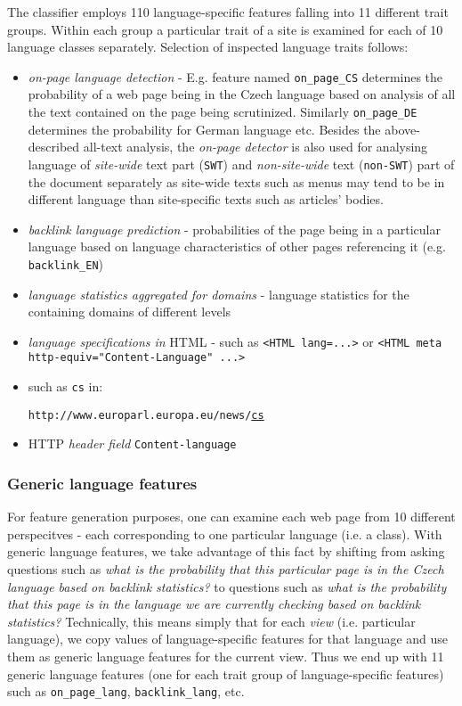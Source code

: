 \documentclass{acm_proc_article-sp}
\begin{document}
{  The classifier employs 110 language-specific features falling into 11 different trait groups. Within each group a
  particular trait of a site is examined for each of 10 language classes separately. Selection of
  inspected language traits follows: 
  \begin{itemize}
    \item \textit{on-page language detection} - E.g. feature named \texttt{on\_page\_CS} determines the
      probability of a web page being in the Czech language based on analysis of all the text
      contained on the page being scrutinized. Similarly \texttt{on\_page\_DE} determines the
      probability for German language etc. Besides the above-described all-text analysis, the \textit{on-page 
      detector} is also used for analysing language of \textit{site-wide} text part (\texttt{SWT}) and
    \textit{non-site-wide} text (\texttt{non-SWT}) part of the document separately as site-wide texts 
      such as menus may tend to be in different language than site-specific texts such as articles' bodies.
    \item \textit{backlink language prediction} - probabilities of the page being in a particular
      language based on language characteristics of other pages referencing it (e.g.
      \texttt{backlink\_EN})
    \item \textit{language statistics aggregated for domains} - language statistics for the
      containing domains of different levels
    \item \textit{language specifications in} HTML - such as \texttt{<HTML lang=...>} or \texttt{<HTML
      meta http-equiv="Content-Language"  ...>}
    \item {} such as \texttt{cs} in:

    \texttt{http://www.europarl.europa.eu/news/}\underline{\texttt{cs}} 
    \item HTTP \textit{header field} \texttt{Content-language}
  \end{itemize}


 \subsubsection{Generic language features}
    For feature generation purposes, one can examine each web page from 10 different perspecitves -
    each corresponding to one particular language (i.e. a class). With generic language features, we
    take advantage of this fact by shifting from asking questions such as \textit{what is the probability that 
    this particular page is in the Czech language based on backlink statistics?} to questions 
    such as \textit{what is the probability that this page is in the language we are currently checking 
    based on backlink statistics?} Technically, this means simply
    that for each \textit{view} (i.e. particular language), we copy values of language-specific
    features for that language and use them as generic language features for the current view. Thus
    we end up with 11 generic language features (one for each trait group of language-specific
    features) such as \texttt{on\_page\_lang}, \texttt{backlink\_lang}, etc.
}
\end{document}
